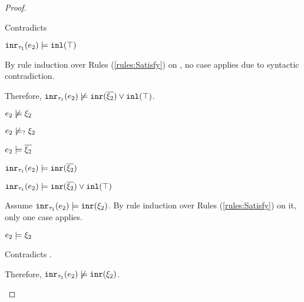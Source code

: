 \begin{proof}
\begin{byCases}
\begin{byCases}
\begin{byCases}
\begin{byCases}
\begin{byCases}
                    Contradicts 
                \end{byCases}
            \item[\text{(\ref{rule:CSOr2})}]
                \begin{pfsteps*}
                \item $\mathtt{inr}_{\tau_1}({e_2}) \models \mathtt{inl}(\top)$  
                \end{pfsteps*}
                By rule induction over Rules (\ref{rules:Satisfy}) on , no case applies due to syntactic contradiction.
            \end{byCases}
            Therefore, $\mathtt{inr}_{\tau_1}({e_2}) \not\models \mathtt{inr}(\overline{\xi_2}) \vee \mathtt{inl}(\top)$.
        \item[\csatisfy{e_2}{\cdual{\xi_2}}]
            \begin{pfsteps*}
            \item $e_2 \not\models \xi_2$  
            \item $e_2 \not\models_{?} \xi_2$  
            \item $e_2 \models \overline{\xi_2}$  
            \item $\mathtt{inr}_{\tau_1}({e_2}) \models \mathtt{inr}(\overline{\xi_2})$  
            \item $\mathtt{inr}_{\tau_1}({e_2}) \models \mathtt{inr}(\overline{\xi_2}) \vee \mathtt{inl}(\top)$ 
            \end{pfsteps*}
            Assume $\mathtt{inr}_{\tau_1}({e_2}) \models \mathtt{inr}(\xi_2)$. By rule induction over Rules (\ref{rules:Satisfy}) on it, only one case applies.
            \begin{byCases}
            \item[\text{(\ref{rule:CSInr})}]
                \begin{pfsteps*}
                \item $e_2 \models \xi_2$
                \end{pfsteps*}
                Contradicts .
            \end{byCases}
            Therefore, $\mathtt{inr}_{\tau_1}({e_2}) \not\models \mathtt{inr}(\xi_2)$. \\

\end{byCases}
\end{byCases}
\end{byCases}
\end{proof}
